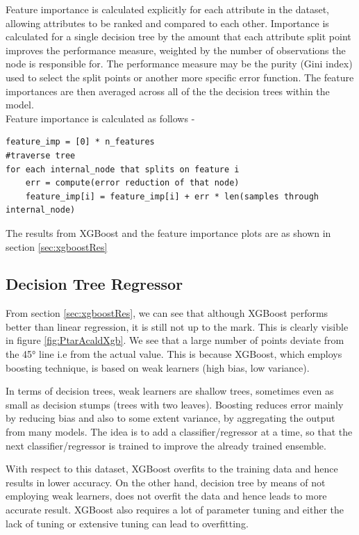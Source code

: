 \documentclass[12pt,chapterheads]{ucsd}
\begin{document}
Feature importance is calculated explicitly for each attribute in the dataset, allowing attributes to be ranked and compared to each other. Importance is calculated for a single decision tree by the amount that each attribute split point improves the performance measure, weighted by the number of observations the node is responsible for. The performance measure may be the purity (Gini index) used to select the split points or another more specific error function. The feature importances are then averaged across all of the the decision trees within the model.\\
Feature importance is calculated as follows -
\begin{verbatim}
feature_imp = [0] * n_features
#traverse tree
for each internal_node that splits on feature i
    err = compute(error reduction of that node)
    feature_imp[i] = feature_imp[i] + err * len(samples through internal_node)
\end{verbatim}
The results from XGBoost and the feature importance plots are as shown in section \ref{sec:xgboostRes}

\subsection{Decision Tree Regressor}
From section \ref{sec:xgboostRes}, we can see that although XGBoost performs better than linear regression, it is still not up to the mark. This is clearly visible in figure \ref{fig:PtarAcaldXgb}. We see that a large number of points deviate from the \ang{45} line i.e from the actual value. This is because XGBoost, which employs boosting technique, is based on weak learners \string(high bias, low variance).

In terms of decision trees, weak learners are shallow trees, sometimes even as small as decision stumps (trees with two leaves). Boosting reduces error mainly by reducing bias and also to some extent variance, by aggregating the output from many models. The idea is to add a classifier/regressor at a time, so that the next classifier/regressor is trained to improve the already trained ensemble.

With respect to this dataset, XGBoost overfits to the training data and hence results in lower accuracy. On the other hand, decision tree by means of not employing weak learners, does not overfit the data and hence leads to more accurate result. XGBoost also requires a lot of parameter tuning and either the lack of tuning or extensive tuning can lead to overfitting.
\end{document}
